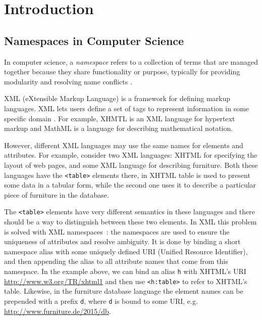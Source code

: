 \section{Introduction}

\subsection{Namespaces in Computer Science}

In computer science, a \emph{namespace} refers to a collection of terms that are managed
together because they share functionality or purpose, typically for providing modularity
and resolving name conflicts \cite{duval2002metadata}.


XML (eXtensible Markup Language) is a framework for defining markup languages.
XML lets users define a set of tags to represent information in some
specific domain \cite{moller2006introduction}. For example, XHMTL is an XML
language for hypertext markup and MathML is a language for describing mathematical
notation.

However, different XML languages may use the same names for elements and attributes.
For example, consider two XML languages: XHTML for specifying the layout of web
pages, and some XML language for describing furniture. Both these languages have
the \verb|<table>| elements there, in XHTML table is used to present some data in
a tabular form, while the second one uses it to describe a particular piece of
furniture in the database.

The \verb|<table>| elements have very different semantics in these languages
and there should be a way to distinguish between these two elements.
In XML this problem is solved with XML namespaces~\cite{xmlnamespaces}:
the namespaces are used to ensure the uniqueness of attributes and resolve ambiguity.
It is done by binding a short namespace alias with some uniquely defined URI
(Unified Resource Identifier), and then appending the alias to
all attribute names that come from this namespace. In the example above,
we can bind an alias \verb|h| with XHTML's URI \url{http://www.w3.org/TR/xhtml1}
and then use \verb|<h:table>| to refer to XHTML's table. Likewise,
in the furniture database language the element names can be prepended
with a prefix \verb|d|, where \verb|d| is bound to some URI, e.g.
\url{http://www.furniture.de/2015/db}.




